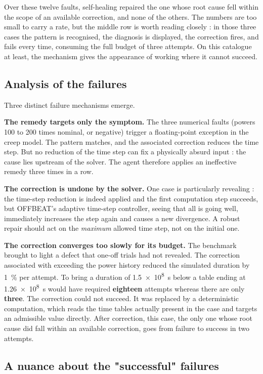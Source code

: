 \documentclass[12pt,a4paper]{report}
\begin{document}
Over these twelve faults, self-healing repaired the one whose root cause fell
within the scope of an available correction, and none of the others. The numbers
are too small to carry a rate, but the middle row is worth reading closely : in
those three cases the pattern is recognised, the diagnosis is displayed, the
correction fires, and fails every time, consuming the full budget of three
attempts. On this catalogue at least, the mechanism gives the appearance of
working where it cannot succeed.

\subsection{Analysis of the failures}

Three distinct failure mechanisms emerge.

\textbf{The remedy targets only the symptom.} The three numerical faults (powers
\num{100} to \num{200} times nominal, or negative) trigger a floating-point
exception in the creep model. The pattern matches, and the associated correction
reduces the time step. But no reduction of the time step can fix a physically
absurd input : the cause lies upstream of the solver. The agent therefore applies
an ineffective remedy three times in a row.

\textbf{The correction is undone by the solver.} One case is particularly
revealing : the time-step reduction is indeed applied and the first computation
step succeeds, but OFFBEAT's adaptive time-step controller, seeing that all is
going well, immediately increases the step again and causes a new divergence. A
robust repair should act on the \emph{maximum} allowed time step, not on the
initial one.

\textbf{The correction converges too slowly for its budget.} The benchmark
brought to light a defect that one-off trials had not revealed. The correction
associated with exceeding the power history reduced the simulated duration by
\SI{1}{\percent} per attempt. To bring a duration of \SI{1.5e8}{\second} below a
table ending at \SI{1.26e8}{\second} would have required \textbf{eighteen}
attempts whereas there are only \textbf{three}. The correction could not succeed. It was replaced by a deterministic computation, which reads the
time tables actually present in the case and targets an admissible value
directly. After correction, this case, the only one whose root cause did fall
within an available correction, goes from failure to success in two attempts.

\subsection{A nuance about the "successful" failures}
\end{document}
